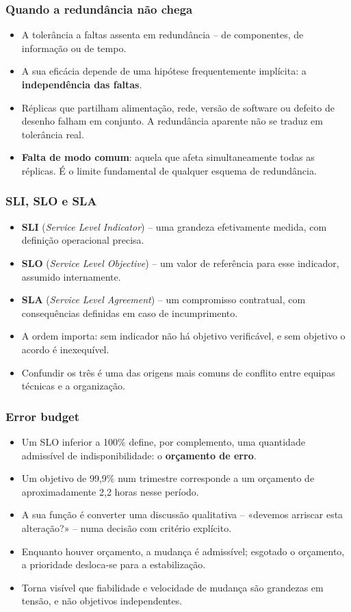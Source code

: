 \documentclass[aspectratio=169]{beamer}
\begin{document}
\begin{frame}
\frametitle{Quando a redundância não chega}
\begin{itemize}
    \setlength\itemsep{0.35cm}
    \item A tolerância a faltas assenta em redundância -- de componentes, de informação ou de tempo.
    \item A sua eficácia depende de uma hipótese frequentemente implícita: a \textbf{independência das faltas}.
    \item Réplicas que partilham alimentação, rede, versão de software ou defeito de desenho falham em conjunto. A redundância aparente não se traduz em tolerância real.
    \item \textbf{Falta de modo comum}: aquela que afeta simultaneamente todas as réplicas. É o limite fundamental de qualquer esquema de redundância.
\end{itemize}
\end{frame}

\begin{frame}
\frametitle{SLI, SLO e SLA}
\begin{itemize}
    \setlength\itemsep{0.35cm}
    \item \textbf{SLI} (\emph{Service Level Indicator}) -- uma grandeza efetivamente medida, com definição operacional precisa.
    \item \textbf{SLO} (\emph{Service Level Objective}) -- um valor de referência para esse indicador, assumido internamente.
    \item \textbf{SLA} (\emph{Service Level Agreement}) -- um compromisso contratual, com consequências definidas em caso de incumprimento.
    \item A ordem importa: sem indicador não há objetivo verificável, e sem objetivo o acordo é inexequível.
    \item Confundir os três é uma das origens mais comuns de conflito entre equipas técnicas e a organização.
\end{itemize}
\end{frame}

\begin{frame}
\frametitle{Error budget}
\begin{itemize}
    \setlength\itemsep{0.35cm}
    \item Um SLO inferior a 100\% define, por complemento, uma quantidade admissível de indisponibilidade: o \textbf{orçamento de erro}.
    \item Um objetivo de 99,9\% num trimestre corresponde a um orçamento de aproximadamente 2,2 horas nesse período.
    \item A sua função é converter uma discussão qualitativa -- «devemos arriscar esta alteração?» -- numa decisão com critério explícito.
    \item Enquanto houver orçamento, a mudança é admissível; esgotado o orçamento, a prioridade desloca-se para a estabilização.
    \item Torna visível que fiabilidade e velocidade de mudança são grandezas em tensão, e não objetivos independentes.
\end{itemize}
\end{frame}
\end{document}
